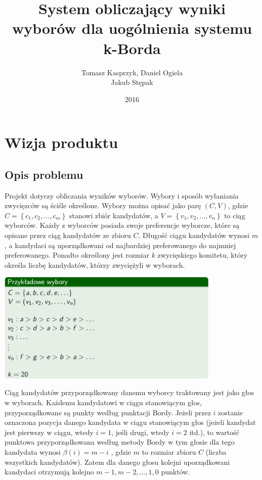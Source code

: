 \documentclass[polish,11pt]{aghthesis}
\author{Tomasz Kasprzyk, Daniel Ogiela\\ Jakub Stępak}
\title{System obliczający wyniki wyborów dla uogólnienia systemu k-Borda}
\date{2016}
\begin{document}
\maketitle
\tableofcontents
\clearpage


\section{Wizja produktu}

\subsection{Opis problemu}
\label{opis_problemu}
Projekt dotyczy obliczania wyników wyborów. Wybory i sposób wyłaniania zwycięzców są
ściśle określone. Wybory można opisać jako parę $(C, V)$, gdzie $C = \left\{c_1, c_2, ... , c_m\right\}$ stanowi zbiór kandydatów, a $V = \left\{v_1, v_2, ... , v_n\right\}$ to ciąg wyborców. Każdy z wyborców posiada swoje preferencje wyborcze, które są opisane przez ciąg kandydatów ze zbioru $C$. Długość ciągu kandydatów wynosi $m$, a kandydaci są uporządkowani od najbardziej preferowanego do najmniej preferowanego. Ponadto określony jest rozmiar $k$ zwycięskiego komitetu, który określa liczbę kandydatów, którzy zwyciężyli w wyborach.

\begin{center}
\includegraphics[width=0.8\textwidth]{pics/przykladowe_wybory.png}
\end{center}
Ciąg kandydatów przyporządkowany danemu wyborcy traktowany jest jako głos w
wyborach. Każdemu kandydatowi w ciągu stanowiącym głos, przyporządkowane są punkty
według punktacji Bordy. Jeżeli przez $i$ zostanie oznaczona pozycja danego kandydata w
ciągu stanowiącym głos (jeżeli kandydat jest pierwszy w ciągu, wtedy $i = 1$, jeśli drugi, wtedy $i = 2$ itd.), to wartość punktowa przyporządkowana według metody Bordy w tym głosie dla tego kandydata wynosi $\beta(i) = m - i$ , gdzie $m$ to rozmiar zbioru $C$ (liczba wszystkich kandydatów). Zatem dla danego głosu kolejni uporządkowani kandydaci otrzymują kolejno $m - 1, m - 2, … , 1, 0$ punktów.
\end{document}
